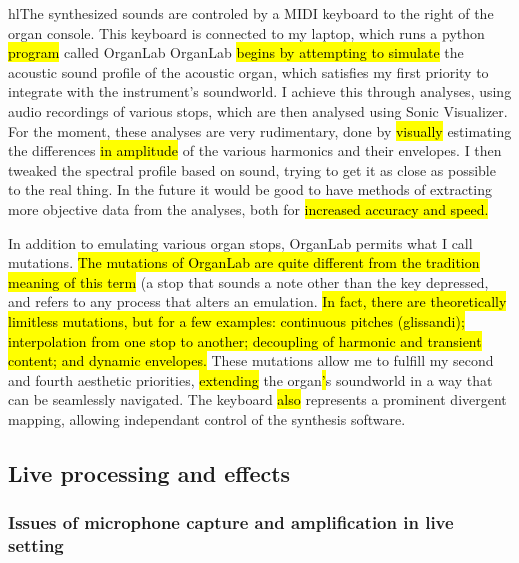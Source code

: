 \documentclass[12pt,twoside,maitrise]{dms_ks}
\theoremstyle{definition}
\begin{document}
{hl{The synthesized sounds are} controled by a MIDI keyboard to the right of the organ console. 
This keyboard is connected to my laptop, which runs a python \hl{program} called OrganLab 
OrganLab \hl{begins by attempting to simulate} the acoustic sound profile of the acoustic organ, which satisfies my first priority to integrate with the instrument's soundworld. 
I achieve this through analyses, using audio recordings of various stops, which are then analysed using Sonic Visualizer. 
For the moment, these analyses are very rudimentary, done  by \hl{visually} estimating the differences \hl{in amplitude }of the various harmonics and their envelopes. 
I then tweaked the spectral profile based on sound, trying to get it as close as possible to the real thing. 
In the future it would be good to have methods of extracting more objective data from the analyses, both for \hl{increased accuracy and speed.}

In addition to emulating various organ stops, OrganLab permits what I call mutations. 
\hl{The mutations of OrganLab are quite different from the tradition meaning of this term} (a stop that sounds a note other than the key depressed, and refers to any process that alters an emulation.  
\hl{In fact, there are theoretically limitless mutations, but for a few examples: continuous pitches (glissandi); interpolation from one stop to another; decoupling of harmonic and transient content; and dynamic envelopes.} 
These mutations allow me to fulfill my second and fourth aesthetic priorities, \hl{extending} the organ\hl{'}s soundworld in a way that can be seamlessly navigated. 
The keyboard \hl{also} represents a prominent divergent mapping, allowing independant control of the synthesis software.  


\subsection{Live processing and effects}

\subsubsection{Issues of microphone capture and amplification in live setting}

}
\end{document}
